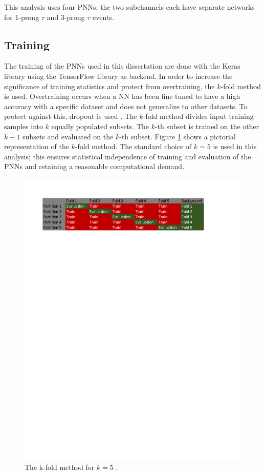 			This analysis uses four \gls{PNN}s; the two subchannels each have separate networks for 1-prong $\tau$ and 3-prong $\tau$ events.

		\subsection{Training}\label{ssec:training}
			The training of the \gls{PNN}s used in this dissertation are done with the Keras \cite{keras} library using the TensorFlow \cite{tensorflow2015-whitepaper} library as backend. In order to increase the significance of training statistics and protect from overtraining, the $k$-fold method is used. Overtraining occurs when a NN has been fine tuned to have a high accuracy with a specific dataset and does not generalize to other datasets. To protect against this, dropout is used \cite{dropout}. The $k$-fold method divides input training samples into $k$ equally populated subsets. The $k$-th subset is trained on the other $k-1$ subsets and evaluated on the $k$-th subset. Figure \ref{fig:k-fold-diagram} shows a pictorial representation of the $k$-fold method. The standard choice of $k=5$ is used in this analysis; this ensures statistical independence of training and evaluation of the \glspl{PNN} and retaining a reasonable computational demand.

			\begin{figure}	
				\begin{center}
					\includegraphics[width=.75\textwidth,keepaspectratio=true]{chapters/chapter6_HPlus/images/kFoldDiagram_noValid.pdf}
				\end{center}
				\caption{The k-fold method for $k=5$ \cite{Burghgrave:2018uwq}.}
				\label{fig:k-fold-diagram}
			\end{figure}	


